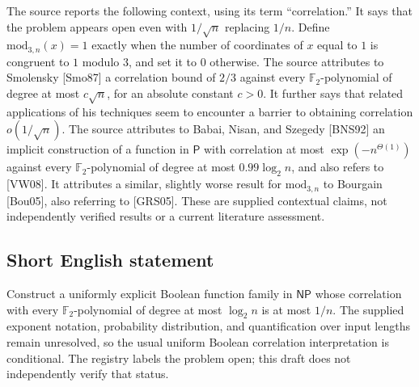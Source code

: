 \documentclass[11pt]{article}
\newcommand{\F}{\mathbb{F}}
\begin{document}
The source reports the following context, using its term ``correlation.'' It says that the problem appears open even with \(1/\sqrt n\) replacing \(1/n\). Define \(\mathrm{mod}_{3,n}(x)=1\) exactly when the number of coordinates of \(x\) equal to \(1\) is congruent to \(1\) modulo \(3\), and set it to \(0\) otherwise. The source attributes to Smolensky [Smo87] a correlation bound of \(2/3\) against every \(\F_2\)-polynomial of degree at most \(c\sqrt n\), for an absolute constant \(c>0\). It further says that related applications of his techniques seem to encounter a barrier to obtaining correlation \(o(1/\sqrt n)\). The source attributes to Babai, Nisan, and Szegedy [BNS92] an implicit construction of a function in \(\mathsf P\) with correlation at most \(\exp(-n^{\Theta(1)})\) against every \(\F_2\)-polynomial of degree at most \(0.99\log_2 n\), and also refers to [VW08]. It attributes a similar, slightly worse result for \(\mathrm{mod}_{3,n}\) to Bourgain [Bou05], also referring to [GRS05]. These are supplied contextual claims, not independently verified results or a current literature assessment.
\subsection{Short English statement}
Construct a uniformly explicit Boolean function family in \(\mathsf{NP}\) whose correlation with every \(\F_2\)-polynomial of degree at most \(\log_2 n\) is at most \(1/n\). The supplied exponent notation, probability distribution, and quantification over input lengths remain unresolved, so the usual uniform Boolean correlation interpretation is conditional. The registry labels the problem open; this draft does not independently verify that status.
\end{document}
